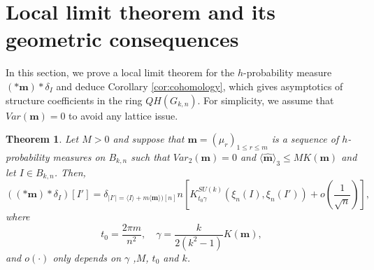 \documentclass[10pt,11pt]{amsart}%
\newtheorem{theorem}{Theorem}[section]
\begin{document}
\section{Local limit theorem and its geometric consequences}\label{sec:LLT}
In this section, we prove a local limit theorem for the $h$-probability measure $(\ast \mathbf{m})*\delta_I$ and deduce Corollary \ref{cor:cohomology}, which gives asymptotics of structure coefficients in the ring $QH(G_{k,n})$. For simplicity, we assume that $Var(\mathbf{m})=0$ to avoid any lattice issue. 
\begin{theorem}
Let $M>0$ and suppose that $\mathbf{m}=(\mu_r)_{1\leq r\leq m}$ is a sequence of $h$-probability measures on $ B_{k,n}$ such that $Var_{2}(\mathbf{m})=0$ and $\langle\widehat{\mathbf{m}}\rangle_3\leq MK(\mathbf{m})$ and let $I\in B_{k,n}$. Then, 
$$\left(\left(\ast \mathbf{m}\right)\ast \delta_I\right)[I']=\delta_{\vert I'\vert=\langle I\rangle+m\langle\mathbf{m}\rangle)[n]}n\left[K_{t_0\gamma}^{SU(k)}(\xi_n(I),\xi_{n}(I'))+o\left(\frac{1}{\sqrt{n}}\right)\right],$$
where 
$$t_0=\frac{2\pi m}{n^2},\quad \gamma=\frac{k}{2(k^2-1)}K(\mathbf{m}),$$
and $o(\cdot)$ only depends on $\gamma$ ,$M$, $t_0$ and $k$. 
\end{theorem}
\end{document}
